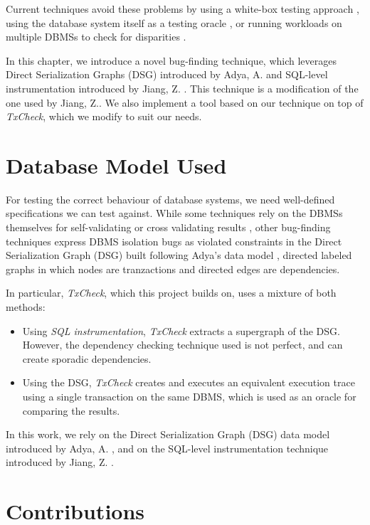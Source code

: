 Current techniques avoid these problems by using a white-box testing approach \cite{clark2024validating}, using the database system itself as a testing oracle \cite{jiang2023detecting}, or running workloads on multiple DBMSs to check for disparities \cite{cui2022differentially_ASE2022}.

In this chapter, we introduce a novel bug-finding technique, which leverages Direct Serialization Graphs (DSG) introduced by Adya, A. \cite{adya1999weak} and SQL-level instrumentation introduced by Jiang, Z. \cite{jiang2023detecting}. This technique is a modification of the one used by Jiang, Z.. We also implement a tool based on our technique on top of \textit{TxCheck}, which we modify to suit our needs.


\section{Database Model Used}

For testing the correct behaviour of database systems, we need well-defined specifications we can test against. While some techniques rely on the DBMSs themselves for self-validating or cross validating results \cite{cui2022differentially_ASE2022}, other bug-finding techniques express DBMS isolation bugs as violated constraints in the Direct Serialization Graph (DSG) built following  Adya's data model \cite{jiang2023detecting,clark2024validating}, directed labeled graphs in which nodes are tranzactions and directed edges are dependencies.

In particular, \textit{TxCheck}, which this project builds on, uses a mixture of both methods:
\begin{itemize}
    \item Using \textit{SQL instrumentation}, \textit{TxCheck} extracts a supergraph of the DSG. However, the dependency checking technique used is not perfect, and can create sporadic dependencies.
    \item Using the DSG, \textit{TxCheck} creates and executes an equivalent execution trace using a single transaction on the same DBMS, which is used as an oracle for comparing the results.
\end{itemize}

In this work, we rely on the Direct Serialization Graph (DSG) data model introduced by Adya, A. \cite{adya1999weak}, and on the SQL-level instrumentation technique introduced by Jiang, Z. \cite{jiang2023detecting}.

\section{Contributions}

